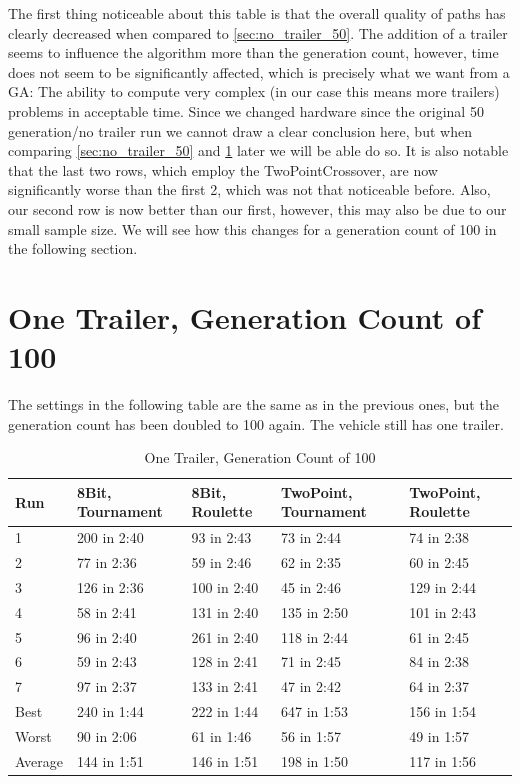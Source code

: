 The first thing noticeable about this table is that the overall quality of paths has clearly decreased when compared to \ref{sec:no_trailer_50}. The addition of a trailer seems to influence the algorithm more than the generation count, however, time does not seem to be significantly affected, which is precisely what we want from a GA: The ability to compute very complex (in our case this means more trailers) problems in acceptable time. Since we changed hardware since the original 50 generation/no trailer run we cannot draw a clear conclusion here, but when comparing \ref{sec:no_trailer_50} and \ref{sec:no_trailer_100} later we will be able do so. It is also notable that the last two rows, which employ the TwoPointCrossover, are now significantly worse than the first 2, which was not that noticeable before. Also, our second row is now better than our first, however, this may also be due to our small sample size. We will see how this changes for a generation count of 100 in the following section.

\section{One Trailer, Generation Count of 100}
\label{sec:no_trailer_100}

The settings in the following table are the same as in the previous ones, but the generation count has been doubled to 100 again. The vehicle still has one trailer.

\begin{table}[H]\caption{One Trailer, Generation Count of 100}
\begin{center}
	\begin{tabular}{| l | l | l | p{3cm} | p{3cm}|}
		\hline
		Run 		& 8Bit, Tournament 	& 8Bit, Roulette 	& TwoPoint, Tournament 	& TwoPoint, Roulette	\\ \hline
		1				& 200 in 2:40				& 93 in 2:43			& 73 in 2:44						& 74 in 2:38					\\ \hline
		2				& 77 in 2:36				& 59 in 2:46			& 62 in 2:35						& 60 in 2:45					\\ \hline
		3				& 126 in 2:36				& 100 in 2:40			& 45 in 2:46						& 129 in 2:44					\\ \hline
		4				& 58 in 2:41				& 131 in 2:40			& 135 in 2:50						& 101 in 2:43					\\ \hline
		5				& 96 in 2:40				& 261 in 2:40			& 118 in 2:44						& 61 in 2:45					\\ \hline
		6				& 59 in 2:43				& 128 in 2:41			& 71 in 2:45						& 84 in 2:38					\\ \hline
		7				& 97 in 2:37				& 133 in 2:41			& 47 in 2:42						& 64 in 2:37					\\ \hline
		Best		&	240 in 1:44				&	222 in 1:44			&	647 in 1:53						&	156 in 1:54					\\ \hline
		Worst		&	90 in 2:06				&	61 in 1:46			&	56 in 1:57						& 49 in 1:57					\\ \hline
		Average	&	144 in 1:51				& 146 in 1:51			& 198 in 1:50						&	117 in 1:56					\\ \hline
		\hline
	\end{tabular}
\end{center}
\end{table}

